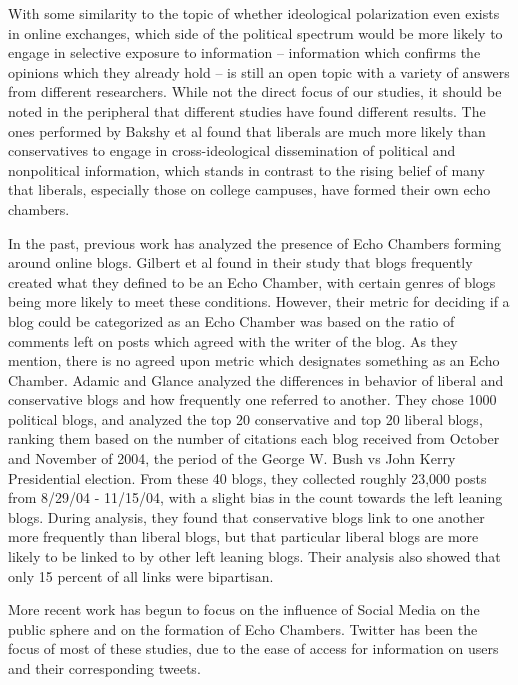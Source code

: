 \documentclass[journal]{IEEEtran}
\begin{document}
	With some similarity to the topic of whether ideological polarization even exists in online exchanges, which side of the political spectrum would be more likely to engage in selective exposure to information -- information which confirms the opinions which they already hold -- is still an open topic with a variety of answers from different researchers. While not the direct focus of our studies, it should be noted in the peripheral that different studies have found different results. The ones performed by Bakshy et al found that liberals are much more likely than conservatives to engage in cross-ideological dissemination of political and nonpolitical information, which stands in contrast to the rising belief of many that liberals, especially those on college campuses, have formed their own echo chambers. 
	
	In the past, previous work has analyzed the presence of Echo Chambers forming around online blogs. Gilbert et al found in their study that blogs frequently created what they defined to be an Echo Chamber, with certain genres of blogs being more likely to meet these conditions. However, their metric for deciding if a blog could be categorized as an Echo Chamber was based on the ratio of comments left on posts which agreed with the writer of the blog. As they mention, there is no agreed upon metric which designates something as an Echo Chamber. Adamic and Glance analyzed the differences in behavior of liberal and conservative blogs and how frequently one referred to another. They chose 1000 political blogs, and analyzed the top 20 conservative and top 20 liberal blogs, ranking them based on the number of citations each blog received from October and November of 2004, the period of the George W. Bush vs John Kerry Presidential election. From these 40 blogs, they collected roughly 23,000 posts from 8/29/04 - 11/15/04, with a slight bias in the count towards the left leaning blogs. During analysis, they found that conservative blogs link to one another more frequently than liberal blogs, but that particular liberal blogs are more likely to be linked to by other left leaning blogs. Their analysis also showed that only 15 percent of all links were bipartisan. 
	
	More recent work has begun to focus on the influence of Social Media on the public sphere and on the formation of Echo Chambers. Twitter has been the focus of most of these studies, due to the ease of access for information on users and their corresponding tweets. 
	
\end{document}
